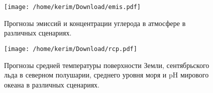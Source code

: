 \documentclass[a4paper, 12pt]{article}
\begin{document}
\begin{figure}%
	\centering
	\texttt{[image: /home/kerim/Download/emis.pdf]}
	\caption{Прогнозы эмиссий и концентрации углерода в атмосфере 
	в различных сценариях.}
	\label{fig:}
\end{figure}%
\begin{figure}%
	\centering
	\texttt{[image: /home/kerim/Download/rcp.pdf]}
	\caption{Прогнозы средней температуры поверхности Земли, 
	сентябрьского льда в северном полушарии, среднего уровня моря и pH 
	мирового океана в различных сценариях.}
	\label{fig:rcp}
\end{figure}%
\end{document}
